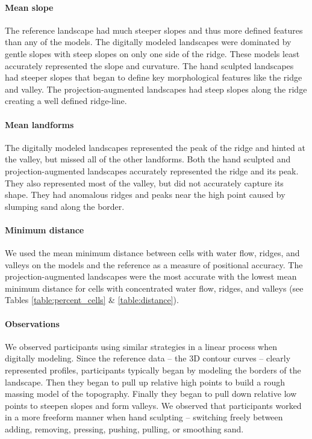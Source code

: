 \documentclass[prodmode,acmtochi]{acmsmall} %
\begin{document}
\paragraph{Mean slope}
The reference landscape had 
much steeper slopes and thus more 
defined features
than any of the models.
%
The digitally modeled landscapes
were dominated by gentle slopes
with steep slopes on only one side of the ridge.
These models
least accurately represented the slope and curvature.
% 
The hand sculpted landscapes 
had steeper slopes
that began to define key morphological features 
like the ridge and valley.
%
The projection-augmented landscapes 
had steep slopes along the ridge
creating a well defined ridge-line. 

\paragraph{Mean landforms}
The digitally modeled landscapes
represented the peak of the ridge
and hinted at the valley, 
but missed all of the other landforms.
% 
Both the hand sculpted and projection-augmented landscapes 
accurately represented the ridge and its peak.
They also represented most of the valley,
but did not accurately capture its shape. 
They had anomalous ridges and peaks 
near the high point
caused by slumping sand along the border.

\paragraph{Minimum distance}
We used
the mean minimum distance between cells
with water flow, ridges, and valleys
on the models and the reference
as a measure of positional accuracy. 
%
The projection-augmented landscapes 
were the most accurate
with the lowest mean minimum distance for cells with
concentrated water flow, ridges, and valleys
(see Tables \ref{table:percent_cells} \& \ref{table:distance}). 

\paragraph{Observations}
We observed participants using similar strategies in a linear process 
when digitally modeling. 
Since the reference data -- the 3D contour curves -- 
clearly represented profiles, 
participants typically began by modeling the borders %
of the landscape.
Then they began to pull up relative high points 
to build a rough massing model of the topography.
Finally they began to pull down relative low points to 
steepen slopes and form valleys.
We observed that participants 
worked in a more freeform manner 
when hand sculpting -- switching freely between
adding, removing, pressing, pushing, pulling, or smoothing
sand.
\end{document}
